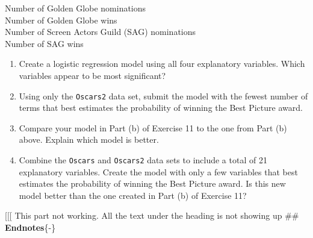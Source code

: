 \documentclass[
]{report}
\begin{document}
\begin{list}{E..}{ \setlength{\itemsep}{1.2em}}
Number of Golden Globe nominations \\
Number of Golden Globe wins \\
Number of Screen Actors Guild (SAG) nominations \\
Number of SAG wins

  \begin{enumerate}
    \item Create a logistic regression model using all four explanatory variables. Which variables appear to be most significant?
    \item Using only the \texttt{Oscars2} data set, submit the model with the fewest number of terms that best estimates the probability of winning the Best Picture award.
    \item Compare your model in Part (b) of Exercise 11 to the one from Part (b) above. Explain which model is better.
    \item Combine the \texttt{Oscars} and \texttt{Oscars2} data sets to include a total of 21 explanatory variables. Create the model with only a few variables that best estimates the probability of winning the Best Picture award. Is this new model better than the one created in Part (b) of Exercise 11?
  \end{enumerate}

\end{list}

{[}{[}{[} This part not working. All the text under the heading is not showing up
\#\# \textbf{Endnotes}\{-\}
\end{document}
